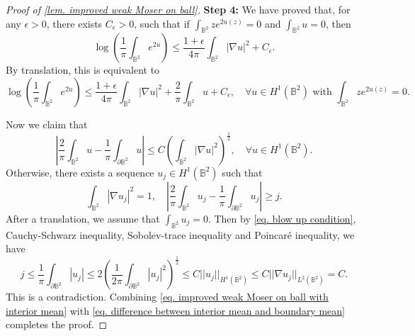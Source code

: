 \documentclass[11pt,a4paper,twoside]{amsart}
\newtheorem{sketch proof}{Sketch of the proof}[section]
\begin{document}
\begin{proof}[Proof of \cref{lem. improved weak Moser on ball}]
        {\bf Step 4:} We have proved that, for any $\epsilon>0$, there exists $C_\epsilon>0$, such that if $\int_{\mathbb{B}^2}ze^{2u(z)}=0$ and
        $\int_{\mathbb{B}^2}u=0$, then  
        \[
        \log\left(
        \frac{1}{\pi}
        \int_{\mathbb{B}^2}e^{2u}
        \right)
        \leq \frac{1+\epsilon}{4\pi}
        \int_{\mathbb{B}^2}|\nabla u|^2
        +C_\epsilon.
        \]
        By translation, this is equivalent to
        \begin{equation}
        \label{eq. improved weak Moser on ball with interior mean}
            \log\left(
        \frac{1}{\pi}
        \int_{\mathbb{B}^2}e^{2u}
        \right)
        \leq \frac{1+\epsilon}{4\pi}
        \int_{\mathbb{B}^2}|\nabla u|^2
        +\frac{2}{\pi}\int_{\mathbb{B}^2}u
        +C_\epsilon,\quad 
        \forall u\in H^1(\mathbb{B}^2)
        \text{ with } 
        \int_{\mathbb{B}^2}ze^{2u(z)}=0.
        \end{equation}
        
        Now we claim that
        \begin{equation}
        \label{eq. difference between interior mean and boundary mean}
            \left|
        \frac{2}{\pi}\int_{\mathbb{B}^2}u
        -\frac{1}{\pi}
        \int_{\partial\mathbb{B}^2}u
        \right|
        \leq C
        \left(\int_{\mathbb{B}^2}|\nabla u|^2
        \right)^{\frac{1}{2}},\quad 
        \forall u\in H^1(\mathbb{B}^2).
        \end{equation}
        Otherwise, there exists a sequence $u_j\in H^1(\mathbb{B}^2)$ such that
        \begin{equation}
        \label{eq. blow up condition}
            \int_{\mathbb{B}^2}|\nabla u_j|^2=1,\quad 
        \left|
        \frac{2}{\pi}\int_{\mathbb{B}^2}u_j
        -\frac{1}{\pi}
        \int_{\partial\mathbb{B}^2}u_j
        \right|
        \geq j.
        \end{equation}
        After a translation, we assume that $\int_{\mathbb{B}^2}u_j=0$. Then by \cref{eq. blow up condition}, Cauchy-Schwarz inequality, Sobolev-trace inequality and Poincar\'e inequality, we have
        \[
        j
        \leq \frac{1}{\pi}\int_{\partial \mathbb{B}^2}
        |u_j|
        \leq 2\left(
        \frac{1}{2\pi}
        \int_{\partial\mathbb{B}^2}|u_j|^2
        \right)^{\frac{1}{2}}
        \leq C||u_j||_{H^1(\mathbb{B}^2)}
        \leq C||\nabla u_j||_{L^2(\mathbb{B}^2)}
        =C.
        \]
        This is a contradiction. Combining \cref{eq. improved weak Moser on ball with interior mean} with \cref{eq. difference between interior mean and boundary mean} completes the proof.
    \end{proof}
\end{document}
